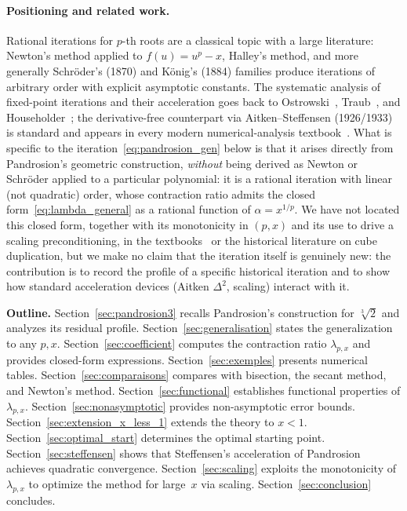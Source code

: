 \documentclass[11pt,a4paper]{article}
\theoremstyle{definition}
\newcommand{\cbrt}[1]{\sqrt[3]{#1}}
\begin{document}
\paragraph{Positioning and related work.}
Rational iterations for $p$-th roots are a classical topic with a large literature: Newton's method applied to $f(u) = u^p - x$, Halley's method, and more generally Schröder's (1870) and König's (1884) families produce iterations of arbitrary order with explicit asymptotic constants. The systematic analysis of fixed-point iterations and their acceleration goes back to Ostrowski~\cite{ostrowski}, Traub~\cite{traub}, and Householder~\cite{householder}; the derivative-free counterpart via Aitken--Steffensen (1926/1933) is standard and appears in every modern numerical-analysis textbook~\cite{stoer,numrecipes}.
What is specific to the iteration~\eqref{eq:pandrosion_gen} below is that it arises directly from Pandrosion's geometric construction, \emph{without} being derived as Newton or Schröder applied to a particular polynomial: it is a rational iteration with linear (not quadratic) order, whose contraction ratio admits the closed form~\eqref{eq:lambda_general} as a rational function of $\alpha = x^{1/p}$.
We have not located this closed form, together with its monotonicity in $(p,x)$ and its use to drive a scaling preconditioning, in the textbooks~\cite{stoer,numrecipes} or the historical literature on cube duplication, but we make no claim that the iteration itself is genuinely new: the contribution is to record the profile of a specific historical iteration and to show how standard acceleration devices (Aitken $\Delta^2$, scaling) interact with it.

\medskip

\textbf{Outline.} Section~\ref{sec:pandrosion3} recalls Pandrosion's construction for $\cbrt{2}$ and analyzes its residual profile. Section~\ref{sec:generalisation} states the generalization to any $p, x$. Section~\ref{sec:coefficient} computes the contraction ratio $\lambda_{p,x}$ and provides closed-form expressions. Section~\ref{sec:exemples} presents numerical tables. Section~\ref{sec:comparaisons} compares with bisection, the secant method, and Newton's method. Section~\ref{sec:functional} establishes functional properties of $\lambda_{p,x}$. Section~\ref{sec:nonasymptotic} provides non-asymptotic error bounds. Section~\ref{sec:extension_x_less_1} extends the theory to $x < 1$. Section~\ref{sec:optimal_start} determines the optimal starting point. Section~\ref{sec:steffensen} shows that Steffensen's acceleration of Pandrosion achieves quadratic convergence. Section~\ref{sec:scaling} exploits the monotonicity of $\lambda_{p,x}$ to optimize the method for large~$x$ via scaling. Section~\ref{sec:conclusion} concludes.
\end{document}
